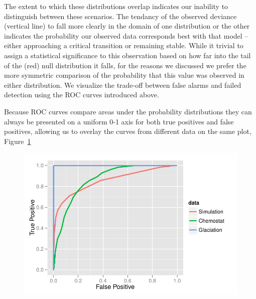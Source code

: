 \documentclass[authoryear,review,11pt]{elsarticle}
\begin{document}
The extent to which these distributions overlap indicates our inability to distinguish between these scenarios.  
The tendancy of the observed deviance (vertical line) to fall more clearly in the domain of one distribution or the other 
indicates the probability our observed data corresponds best with that model  -- 
either approaching a critical transition or remaining stable.  
While it trivial to assign a statistical significance to this observation based 
on how far into the tail of the (red) null distribution it falls, 
for the reasons we discussed we prefer the more symmetric comparison of the probability that 
this value was observed in either distribution.  
We visualize the trade-off between false alarms and failed detection using the ROC curves introduced above.  

Because ROC curves compare areas under the probability distributions they can always be presented on a uniform 0-1 axis
for both true positives and false positives, allowing us to overlay the curves from different data on the same plot,
Figure~\ref{fig:rocdata}

 \begin{figure}
   \begin{center}
     \includegraphics[width=\linewidth]{figures/rocplot.pdf}
     \caption{ }
     \label{fig:rocdata}
  \end{center}
 \end{figure}


\end{document}
